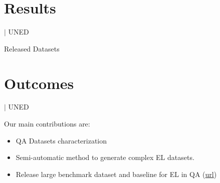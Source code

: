 \documentclass[]{beamer}
\def\mAlertSpace{\vspace{0.5em}}
\newcommand{\mShortTitle}{\secname \hfill {\scriptsize$|$ UNED}}
\begin{document}
\section{Results}
  \begin{frame}{\mShortTitle}
    \mAlertSpace
    \begin{alertblock}{Released Datasets}
      
    \end{alertblock}
  \end{frame}

\section{Outcomes}
  \begin{frame}{\mShortTitle}
    \begin{alertblock}{Our main contributions are:}
      \begin{itemize}
        \item QA Datasets characterization
        \item Semi-automatic method to generate complex EL datasets.
        \item Release large benchmark dataset and baseline for EL in QA (\href{https://github.com/m0n0l0c0/benchmarking_entity_linking/blob/master/datasets/Complex-EL4QA.json}{url})
      \end{itemize}
    \end{alertblock}      
  \end{frame}
\end{document}
